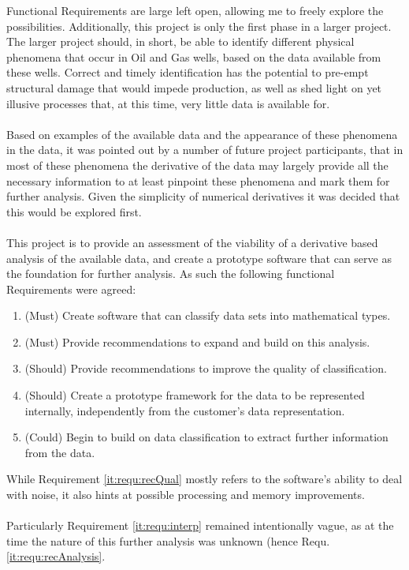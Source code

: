 \documentclass[main.tex]{subfiles}
\begin{document}
    Functional Requirements are large left open, allowing me to freely explore the possibilities. Additionally, this project is only the first phase in a larger project. The larger project should, in short, be able to identify different physical phenomena that occur in Oil and Gas wells, based on the data available from these wells. Correct and timely identification has the potential to pre-empt structural damage that would impede production, as well as shed light on yet illusive processes that, at this time, very little data is available for.
    \\\\
    Based on examples of the available data and the appearance of these phenomena in the data, it was pointed out by a number of future project participants, that in most of these phenomena the derivative of the data may largely provide all the necessary information to at least pinpoint these phenomena and mark them for further analysis. Given the simplicity of numerical derivatives it was decided that this would be explored first.
    \\\\ 
    This project is to provide an assessment of the viability of a derivative based analysis of the available data, and create a prototype software that can serve as the foundation for further analysis. As such the following functional Requirements were agreed:
    
    \begin{enumerate}
      \item \label{it:requ:classify} (Must) Create software that can classify data sets into mathematical types.
      \item \label{it:requ:recAnalysis} (Must) Provide recommendations to expand and build on this analysis.
      \item \label{it:requ:recQual} (Should) Provide recommendations to improve the quality of classification.
      \item \label{it:requ:data} (Should) Create a prototype framework for the data to be represented internally, independently from the customer's data representation.
      \item  \label{it:requ:interp} (Could) Begin to build on data classification to extract further information from the data.
    \end{enumerate}
    
    While Requirement \ref{it:requ:recQual} mostly refers to the software's ability to deal with noise, it also hints at possible processing and memory improvements.
    \\\\
    Particularly Requirement \ref{it:requ:interp} remained intentionally vague, as at the time the nature of this further analysis was unknown (hence Requ. \ref{it:requ:recAnalysis}.
    
\end{document}
